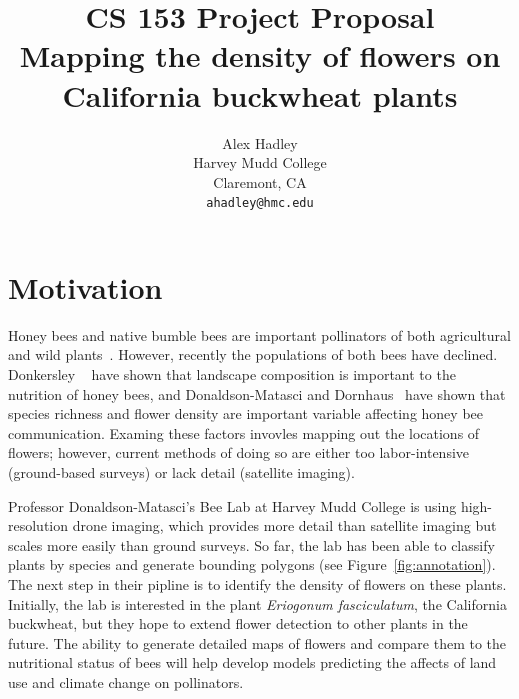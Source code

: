 \documentclass[10pt,twocolumn,letterpaper]{article}
\begin{document}
\title{CS 153 Project Proposal\\
Mapping the density of flowers on California buckwheat plants
}

\author{Alex Hadley\\
Harvey Mudd College\\
Claremont, CA\\
{\tt\small ahadley@hmc.edu}
}
\maketitle


\section{Motivation}

Honey bees and native bumble bees are important pollinators of both agricultural and wild plants~\cite{Potts}. However, recently the populations of both bees have declined. Donkersley \etal~\cite{Donkersley} have shown that landscape composition is important to the nutrition of honey bees, and Donaldson-Matasci and Dornhaus~\cite{Donaldson} have shown that species richness and flower density are important variable affecting honey bee communication. Examing these factors invovles mapping out the locations of flowers; however, current methods of doing so are either too labor-intensive (\eg ground-based surveys) or lack detail (\eg satellite imaging).

Professor Donaldson-Matasci's Bee Lab at Harvey Mudd College is using high-resolution drone imaging, which provides more detail than satellite imaging but scales more easily than ground surveys. So far, the lab has been able to classify plants by species and generate bounding polygons (see Figure~\ref{fig:annotation}). The next step in their pipline is to identify the density of flowers on these plants. Initially, the lab is interested in the plant \textit{Eriogonum fasciculatum}, the California buckwheat, but they hope to extend flower detection to other plants in the future. The ability to generate detailed maps of flowers and compare them to the nutritional status of bees will help develop models predicting the affects of land use and climate change on pollinators.
\end{document}
